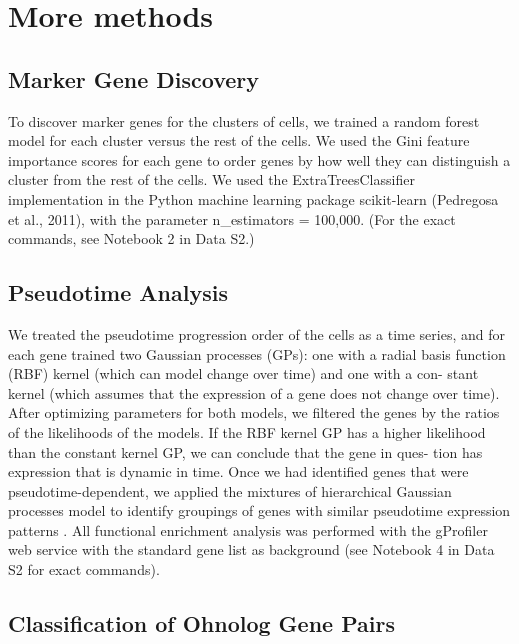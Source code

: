 \section{More methods}

\subsection{Marker Gene Discovery}

To discover marker genes for the clusters of cells, we trained a random forest model for each cluster versus the rest of the cells. We used the Gini feature importance scores for each gene to order genes by how well they can distinguish a cluster from the rest of the cells. We used the ExtraTreesClassifier  \cite{Geurts2006-qg} implementation in the Python machine learning package scikit-learn (Pedregosa et al., 2011), with the parameter n\_estimators = 100,000. (For the exact commands, see Notebook 2 in Data S2.)

\subsection{Pseudotime Analysis}

We treated the pseudotime progression order of the cells as a time series, and for each gene trained two Gaussian processes (GPs): one with a radial basis function (RBF) kernel (which can model change over time) and one with a con- stant kernel (which assumes that the expression of a gene does not change over time). After optimizing parameters for both models, we filtered the genes by the ratios of the likelihoods of the models. If the RBF kernel GP has a higher likelihood than the constant kernel GP, we can conclude that the gene in ques- tion has expression that is dynamic in time. Once we had identified genes that were pseudotime-dependent, we applied the mixtures of hierarchical Gaussian processes model to identify groupings of genes with similar pseudotime expression patterns  \cite{Hensman2015-op}. All functional enrichment analysis was performed with the gProfiler  \cite{Reimand2011-ht} web service with the standard gene list as background (see Notebook 4 in Data S2 for exact commands).
              
\subsection{Classification of Ohnolog Gene Pairs}


